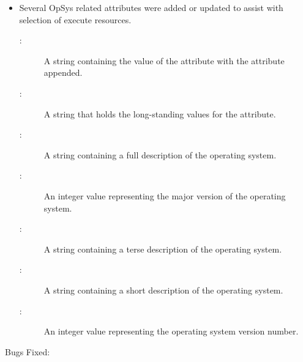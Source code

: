 \begin{itemize}
\item Several OpSys related attributes were added or updated to assist with selection of execute resources.
\begin{description}
\item [:] A string containing the value of the  attribute with the  attribute appended.
\item [:] A string that holds the long-standing values for the  attribute.
\item [:] A string containing a full description of the operating system.
\item [:] An integer value representing the major version of the operating system.
\item [:] A string containing a terse description of the operating system.
\item [:] A string containing a short description of the operating system.
\item [:] An integer value representing the operating system version number.
\end{description}

\end{itemize}

\noindent Bugs Fixed:

